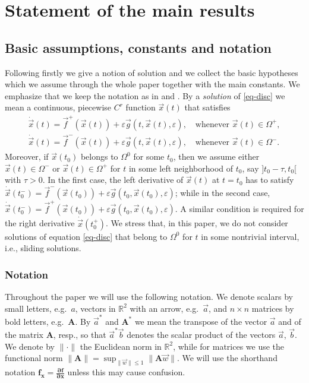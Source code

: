 \documentclass[10pt]{article}
\numberwithin{equation}{section}
\def\ep{\varepsilon}
\def\Om{\Omega}
\def\R{{\mathbb R}}
\def\x{\vec{x}}
\def\f{\vec{f}}
\def\g{\vec{g}}
\newcommand\bs[1]{{\boldsymbol{#1}}}
\theoremstyle{definition}
\theoremstyle{remark}
\begin{document}


\section{Statement of the main results}\label{S.setting}

\subsection{Basic assumptions, constants and notation}
Following \cite{CFPRimut, CFPrestate} firstly  we give a notion of solution and we collect the basic hypotheses which we assume through the whole paper together with the main
constants. We emphasize that we keep the notation as in \cite{CFPRimut} and \cite{CFPrestate}.
%
By a \emph{solution} of
\eqref{eq-disc} we mean a continuous, piecewise $C^r$ function
$\x(t)$ that satisfies
\begin{align}
\dot{\x}(t)=\f^+(\x(t)) + \ep \g(t,\x(t),\ep), \quad \textrm{whenever } \x(t) \in \Om^+,  \label{eq-disc+} \tag{PS$+$}\\
\dot{\x}(t)=\f^-(\x(t)) + \ep \g(t,\x(t),\ep), \quad \textrm{whenever } \x(t) \in \Om^-. \label{eq-disc-}\tag{PS$-$}
\end{align}
 Moreover, if  $\x(t_{0})$ belongs to
$\Om^{0}$ for some $t_0$,   then  we assume
either $\x(t)\in\Om^{-}$ or $\x(t)\in\Om^{+}$  for $t$ in some left neighborhood of
$t_{0}$, say $]t_{0}-\tau,t_{0}[$ with $\tau>0$.
In the first case, the
left derivative of $\x(t)$ at $t=t_0$ has to satisfy $\dot
\x(t_{0}^{-}) = \f^{-}(\x(t_0))+ \ep \g(t_0,\x(t_0),\ep)$; while in the
second case, $\dot \x(t_{0}^{-}) = \f^{+}(\x(t_0))+ \ep
\g(t_0,\x(t_0),\ep)$. A similar condition is required for the right
derivative $\dot \x(t_{0}^{+})$.
We stress that, in this paper, we do not consider solutions of equation
\eqref{eq-disc} that belong to $\Om^{0}$ for $t$ in some
nontrivial interval, i.e., sliding solutions.


\subsubsection*{Notation}
Throughout the paper we will use the following notation. We denote scalars by small letters,
e.g.\ $a$, vectors in $\R^2$ with an arrow, e.g.\ $\vec{a}$, and $n \times n$ matrices by bold letters, e.g.\ $\bs{A}$.
By $\vec{a}^*$ and $\bs{A}^*$ we mean the transpose of the vector $\vec{a}$ and of the matrix $\bs{A}$, resp.,
so that $\vec{a}^*\vec{b}$ denotes the scalar product of the vectors $\vec{a}$, $\vec{b}$.
We denote by $\|\cdot\|$ the Euclidean norm in $\R^2$, while for matrices
we use the functional norm $\|\bs{A}\|= \sup_{\|\vec{w}\| \le 1} \|\bs{A} \vec{w}\|$.
We will use the shorthand notation $\bs{f_x}=\bs{\frac{\partial f}{\partial x}}$ unless this may cause confusion.
\end{document}
